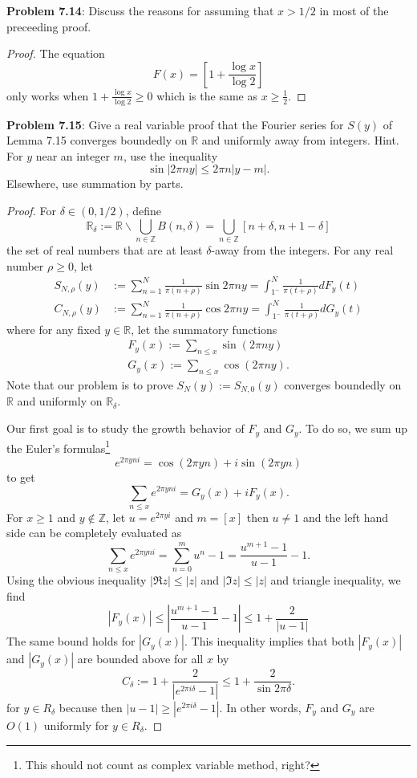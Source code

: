 \documentclass[12pt]{article}
\newcommand{\Z}{\mathbb{Z}}
\newcommand{\R}{\mathbb{R}}
\newcommand{\Abs}[1]{\left| #1 \right|}
\newcommand{\IntPart}[1]{\left[ #1 \right]}
\begin{document}
\fi

\textbf{Problem 7.14}: Discuss the reasons for assuming that $x > 1/2$ in most of the preceeding proof.

\begin{proof}
The equation
$$F(x) = \IntPart{ 1 + \frac{\log x}{\log 2} }$$
only works when $1 + \frac{\log x}{\log 2} \geq 0$ which is the same as $x \geq \frac{1}{2}$.
\end{proof}

\textbf{Problem 7.15}: Give a real variable proof that the Fourier series for $S(y)$ of Lemma 7.15 converges boundedly on $\R$ and uniformly away from integers. Hint. For $y$ near an integer $m$, use the inequality
$$\sin|2\pi n y| \leq 2\pi n |y - m|.$$
Elsewhere, use summation by parts.

\begin{proof}
For $\delta \in (0, 1/2)$, define
$$\R_\delta := \R \backslash \bigcup_{n \in \Z} B(n, \delta) = \bigcup_{n \in \Z} [n + \delta, n + 1 - \delta]$$
the set of real numbers that are at least $\delta$-away from the integers. For any real number $\rho \geq 0$, let
\begin{align*}
S_{N,\rho}(y) &:= \sum_{n=1}^N \frac{1}{\pi (n + \rho)} \sin 2\pi n y = \int_{1^-}^N \frac{1}{\pi (t + \rho)} d F_y(t)\\
C_{N,\rho}(y) &:= \sum_{n=1}^N \frac{1}{\pi (n + \rho)} \cos 2\pi n y = \int_{1^-}^N \frac{1}{\pi (t + \rho)} d G_y(t)
\end{align*}
where for any fixed $y \in \R$, let the summatory functions
\begin{align*}
F_y(x) := \sum_{n \leq x} \sin(2 \pi n y)\\
G_y(x) := \sum_{n \leq x} \cos(2 \pi n y).
\end{align*}
Note that our problem is to prove $S_N(y) := S_{N, 0}(y)$ converges boundedly on $\R$ and uniformly on $\R_\delta$.

Our first goal is to study the growth behavior of $F_y$ and $G_y$. To do so, we sum up the Euler's formulas\footnote{This should not count as complex variable method, right?}
$$e^{2 \pi y n i} = \cos(2 \pi y n) + i \sin(2\pi y n)$$
to get
$$\sum_{n \leq x} e^{2 \pi y n i} = G_y(x) + i F_y(x).$$
For $x \geq 1$ and $y \not\in \Z$, let $u = e^{2 \pi y i}$ and $m = [x]$ then $u \not= 1$ and the left hand side can be completely evaluated as
$$\sum_{n \leq x} e^{2 \pi y n i} = \sum_{n = 0}^{m} u^n - 1 = \frac{u^{m + 1} - 1}{u - 1} - 1.$$
Using the obvious inequality $|\Re z| \leq |z|$ and $|\Im z| \leq |z|$ and triangle inequality, we find
$$|F_y(x)| \leq \Abs{ \frac{u^{m + 1} - 1}{u - 1} - 1 } \leq 1 + \frac{2}{|u - 1|}$$
The same bound holds for $|G_y(x)|$. This inequality implies that both $|F_y(x)|$ and $|G_y(x)|$ are bounded above for all $x$ by
$$C_\delta := 1 + \frac{2}{|e^{2\pi i \delta} - 1|} \leq 1 + \frac{2}{\sin 2\pi\delta}.$$
for $y \in R_\delta$ because then $|u - 1| \geq |e^{2\pi i \delta} - 1|$. In other words, $F_y$ and $G_y$ are $O(1)$ uniformly for $y \in R_\delta$.


\end{proof}
\end{document}
